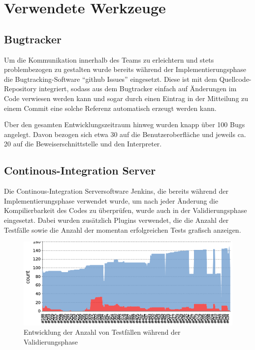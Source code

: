 \section{Verwendete Werkzeuge}
\subsection{Bugtracker}
Um die Kommunikation innerhalb des Teams zu erleichtern und stets problembezogen zu gestalten wurde bereits während der Implementierungsphase  die Bugtracking-Software ``github Issues'' eingesetzt. Diese ist mit dem Quellcode-Repository integriert, sodass aus dem Bugtracker einfach auf Änderungen im Code verwiesen werden kann und sogar durch einen Eintrag in der Mitteilung zu einem Commit eine solche Referenz automatisch erzeugt werden kann.

Über den gesamten Entwicklungszeitraum hinweg wurden knapp über 100 Bugs angelegt. Davon bezogen sich etwa 30 auf die Benutzeroberfläche und jeweils ca. 20 auf die Beweiserschnittstelle und den Interpreter.

\subsection{Continous-Integration Server}
Die Continous-Integration Serversoftware Jenkins, die bereits während der Implementierungsphase verwendet wurde, um nach jeder Änderung die Kompilierbarkeit des Codes zu überprüfen, wurde auch in der Validierungsphase eingesetzt. Dabei wurden zusätzlich Plugins verwendet, die die Anzahl der Testfälle sowie die Anzahl der momentan erfolgreichen Tests grafisch anzeigen.

\begin{center}
	\begin{figure}[h] %
		\includegraphics[width=13cm]{images/jenkins-test-trend.png}
		\caption{Entwicklung der Anzahl von Testfällen während der Validierungsphase}
	\end{figure}
\end{center}
